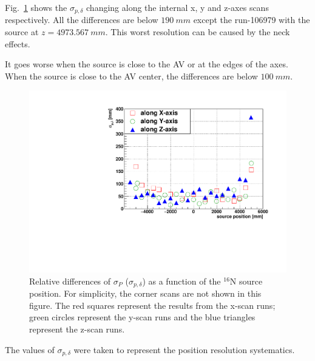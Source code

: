 Fig.~\ref{pos_relative_sigma_biasesVsPositions} shows the $\sigma_{p,\delta}$ changing along the internal x, y and z-axes scans respectively. All the differences are below $190~mm$ except the run-106979 with the source at $z=4973.567~mm$. This worst resolution can be caused by the neck effects. 

It goes worse when the source is close to the AV or at the edges of the axes. When the source is close to the AV center, the differences are below $100~mm$.

\begin{figure}[!htb]
	\centering
	\includegraphics[width=16cm]{N16_6176_pos_sigmaP_data_mc.pdf}
	\caption{Relative differences of $\sigma_P$ ($\sigma_{p,\delta}$) as a function of the $^{16}$N source position. For simplicity, the corner scans are not shown in this figure. The red squares represent the results from the x-scan runs; green circles represent the y-scan runs and the blue triangles represent the z-scan runs.}
	\label{pos_relative_sigma_biasesVsPositions}
\end{figure}

The values of $\sigma_{p,\delta}$ were taken to represent the position resolution systematics.

